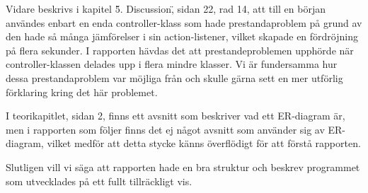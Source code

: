 \documentclass[a4paper, 12pt]{article}
\begin{document}
Vidare beskrivs i kapitel \"5. Discussion\", sidan 22, rad 14, att till en början användes enbart en enda controller-klass som hade prestandaproblem på grund av den hade så många jämförelser i sin action-listener, vilket skapade en fördröjning på flera sekunder. I rapporten hävdas det att prestandeproblemen upphörde när controller-klassen delades upp i flera mindre klasser. Vi är fundersamma hur dessa prestandaproblem var möjliga från och skulle gärna sett en mer utförlig förklaring kring det här problemet. 

I teorikapitlet, sidan 2, finns ett avsnitt som beskriver vad ett ER-diagram är, men i rapporten som följer finns det ej något avsnitt som använder sig av ER-diagram, vilket medför att detta stycke känns överflödigt för att förstå rapporten.

Slutligen vill vi säga att rapporten hade en bra struktur och beskrev programmet som utvecklades på ett fullt tillräckligt vis.
    
\end{document}
